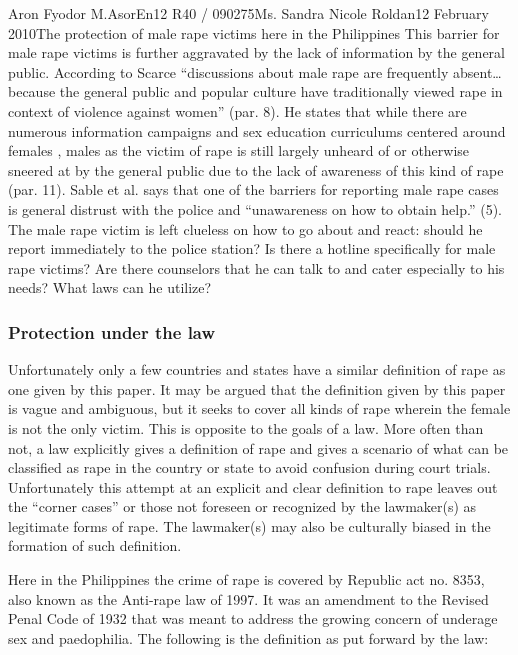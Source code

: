 \documentclass[12pt,letterpaper]{article}
\begin{document}
\begin{mla}{Aron Fyodor M.}{Asor}{En12 R40 / 090275}{Ms. Sandra Nicole Roldan}{12 February 2010}{The protection of male rape victims here in the Philippines}
This barrier for male rape victims is further aggravated by the lack of information by the general public. According to Scarce ``discussions about male rape are frequently absent\ldots because the general public and popular culture have traditionally viewed rape in context of violence against women'' (par. 8). He states that while there are numerous information campaigns and sex education curriculums centered around females , males as the victim of rape is still largely unheard of or otherwise sneered at by the general public due to the lack of awareness of this kind of rape (par. 11). Sable et al. says that one of the barriers for reporting male rape cases is general distrust with the police and ``unawareness on how to obtain help.'' (5). The male rape victim is left clueless on how to go about and react: should he report immediately to the police station? Is there a hotline specifically for male rape victims? Are there counselors that he can talk to and cater especially to his needs? What laws can he utilize?

\subsubsection{Protection under the law}
%
%
\tab Unfortunately only a few countries and states have a similar definition of rape as one given by this paper. It may be argued that the definition given by this paper is vague and ambiguous, but it seeks to cover all kinds of rape wherein the female is not the only victim. This is opposite to the goals of a law. More often than not, a law explicitly gives a definition of rape and gives a scenario of what can be classified as rape in the country or state to avoid confusion during court trials. Unfortunately this attempt at an explicit and clear definition to rape leaves out the ``corner cases'' or those not foreseen or recognized by the lawmaker(s) as legitimate forms of rape. The lawmaker(s) may also be culturally biased in the formation of such definition. 

Here in the Philippines the crime of rape is covered by Republic act no. 8353, also known as the Anti-rape law of 1997. It was an amendment to the Revised Penal Code of 1932 that was meant to address the growing concern of underage sex and paedophilia. The following is the definition as put forward by the law:


\end{mla}
\end{document}
